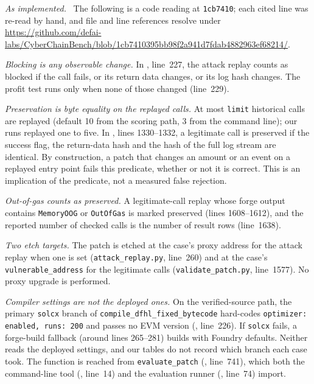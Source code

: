 \documentclass[conference]{IEEEtran}
\newcommand{\code}[1]{\texttt{#1}}
\newcommand{\para}[1]{\textit{#1.}\ }
\begin{document}
\para{As implemented} The following is a code reading at \code{1cb7410}; each cited line was re-read by hand, and file and line references resolve under \url{https://github.com/defai-labs/CyberChainBench/blob/1cb7410395bb98f2a941d7fdab4882963ef68214/}.

\emph{Blocking is any observable change.} In , line~227, the attack replay counts as blocked if the call fails, or its return data changes, or its log hash changes. The profit test runs only when none of those changed (line~229).

\emph{Preservation is byte equality on the replayed calls.} At most \code{limit} historical calls are replayed (default 10 from the scoring path, 3 from the command line); our runs replayed one to five. In , lines 1330--1332, a legitimate call is preserved if the success flag, the return-data hash and the hash of the full log stream are identical. By construction, a patch that changes an amount or an event on a replayed entry point fails this predicate, whether or not it is correct. This is an implication of the predicate, not a measured false rejection.

\emph{Out-of-gas counts as preserved.} A legitimate-call replay whose forge output contains \code{MemoryOOG} or \code{OutOfGas} is marked preserved (lines 1608--1612), and the reported number of checked calls is the number of result rows (line~1638).

\emph{Two etch targets.} The patch is etched at the case's proxy address for the attack replay when one is set (\code{attack\_replay.py}, line~260) and at the case's \code{vulnerable\_address} for the legitimate calls (\code{validate\_patch.py}, line~1577). No proxy upgrade is performed.

\emph{Compiler settings are not the deployed ones.} On the verified-source path, the primary \code{solcx} branch of \code{compile\_dfhl\_fixed\_bytecode} hard-codes \code{optimizer: enabled, runs: 200} and passes no EVM version (, line~226). If \code{solcx} fails, a forge-build fallback (around lines 265--281) builds with Foundry defaults. Neither reads the deployed settings, and our tables do not record which branch each case took. The function is reached from \code{evaluate\_patch} (, line~741), which both the command-line tool (, line~14) and the evaluation runner (, line~74) import.
\end{document}
